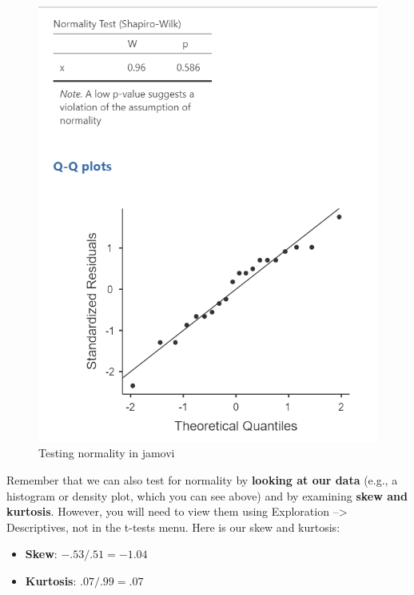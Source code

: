 \documentclass[
]{book}
\begin{document}
\begin{figure}

{\centering \includegraphics[width=1\linewidth]{images/07.1-one_sample_t-test/normality} 

}

\caption{Testing normality in jamovi}\label{fig:unnamed-chunk-4}
\end{figure}

Remember that we can also test for normality by \textbf{looking at our data} (e.g., a histogram or density plot, which you can see above) and by examining \textbf{skew and kurtosis}. However, you will need to view them using Exploration --\textgreater{} Descriptives, not in the t-tests menu. Here is our skew and kurtosis:

\begin{itemize}
\item
  \textbf{Skew}: \(-.53/.51 = -1.04\)
\item
  \textbf{Kurtosis}: \(.07/.99 = .07\)
\end{itemize}
\end{document}
